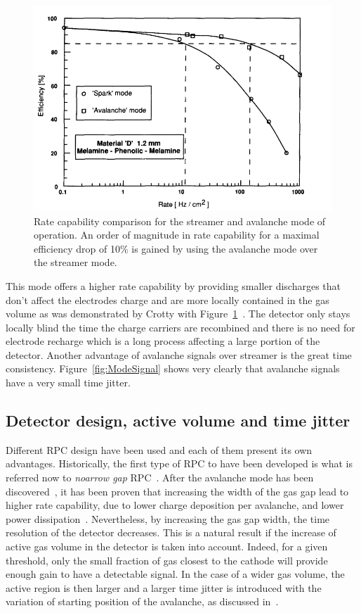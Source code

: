 	\begin{figure}[!h]
		\centering
		\includegraphics[width = \plotwidth]{fig/chapt4/Rate_Mode_Comparison.png}
		\caption{\label{fig:ModeRate} Rate capability comparison for the streamer and avalanche mode of operation. An order of magnitude in rate capability for a maximal efficiency drop of 10\% is gained by using the avalanche mode over the streamer mode.}
	\end{figure}
	
	This mode offers a higher rate capability by providing smaller discharges that don't affect the electrodes charge and are more locally contained in the gas volume as was demonstrated by Crotty with Figure~\ref{fig:ModeRate}~\cite{CROTTY93}. The detector only stays locally blind the time the charge carriers are recombined and there is no need for electrode recharge which is a long process affecting a large portion of the detector. Another advantage of avalanche signals over streamer is the great time consistency. Figure~\ref{fig:ModeSignal} shows very clearly that avalanche signals have a very small time jitter.
	
	\subsection{Detector design, active volume and time jitter}
	\label{Chapt4:ssec:design}
	
	Different RPC design have been used and each of them present its own advantages. Historically, the first type of RPC to have been developed is what is referred now to \textit{noarrow gap} RPC~\cite{SANTONICO81,ZEBALLOS96COMP}. After the avalanche mode has been discovered~\cite{CROTTY93}, it has been proven that increasing the width of the gas gap lead to higher rate capability, due to lower charge deposition per avalanche, and lower power dissipation~\cite{ZEBALLOS96COMP}. Nevertheless, by increasing the gas gap width, the time resolution of the detector decreases. This is a natural result if the increase of active gas volume in the detector is taken into account. Indeed, for a given threshold, only the small fraction of gas closest to the cathode will provide enough gain to have a detectable signal. In the case of a wider gas volume, the active region is then larger and a larger time jitter is introduced with the variation of starting position of the avalanche, as discussed in~\cite{ZEBALLOS96MRPC}.

